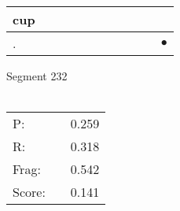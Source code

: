 \documentclass[landscape]{article}
\newcommand{\ssp}{\hspace{2pt}}
\newcommand{\mex}{\cellcolor{g}$\bullet$}
\begin{document}
\begin{tabular}{|l|p{10pt}|p{10pt}|p{10pt}|p{10pt}|p{10pt}|p{10pt}|p{10pt}|p{10pt}|p{10pt}|p{10pt}|}
\hline
\ssp cup \ssp&\hspace{2pt}&\hspace{2pt}&\hspace{2pt}&\hspace{2pt}&\hspace{2pt}&\hspace{2pt}&\hspace{2pt}&\hspace{2pt}&\hspace{2pt}&\hspace{2pt}\\
\hline
\ssp \cellcolor{ref9}. \ssp&\hspace{2pt}&\hspace{2pt}&\hspace{2pt}&\hspace{2pt}&\hspace{2pt}&\hspace{2pt}&\hspace{2pt}&\hspace{2pt}&\hspace{2pt}&\hspace{2pt}\mex\\
\hline
\end{tabular}

\vspace{6pt}
\noindent Segment 232\\\\
\noindent\begin{tabular}{lm{12pt}r}
\hline
P:&&0.259\\
R:&&0.318\\
Frag:&&0.542\\
Score:&&0.141\\
\end{tabular}

\newpage
\end{document}

